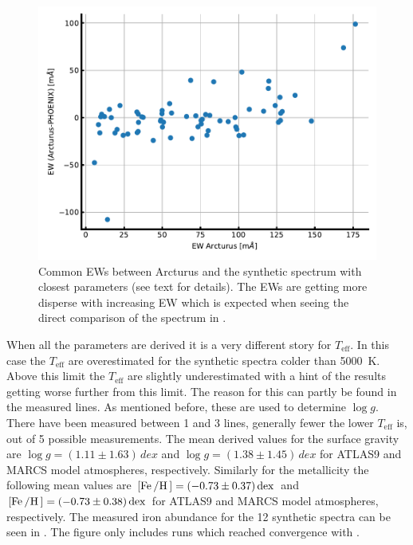\begin{figure}[htpb!]
    \centering
    \includegraphics[width=0.8\linewidth]{figures/commonEWS.pdf}
    \caption{Common EWs between Arcturus and the synthetic spectrum with closest parameters (see
             text for details). The EWs are getting more disperse with increasing EW which is
             expected when seeing the direct comparison of the spectrum in
             .}
    \label{fig:commonEWs}
\end{figure}

When all the parameters are derived it is a very different story for $T_\mathrm{eff}$. In this case
the $T_\mathrm{eff}$ are overestimated for the synthetic spectra colder than \SI{5000}{K}. Above
this limit the $T_\mathrm{eff}$ are slightly underestimated with a hint of the results getting worse
further from this limit. The reason for this can partly be found in the measured  lines.
As mentioned before, these are used to determine $\log g$. There have been measured between 1 and 3
 lines, generally fewer the lower $T_\mathrm{eff}$ is, out of 5 possible measurements.
The mean derived values for the surface gravity are $\log g=(1.11\pm1.63)\,\si{dex}$ and $\log
g=(1.38\pm1.45)\,\si{dex}$ for ATLAS9 and MARCS model atmospheres, respectively. Similarly for the
metallicity the following mean values are $[\ion{Fe}/\ion{H}]=\SI{-0.73(37)}{dex}$ and
$[\ion{Fe}/\ion{H}]=\SI{-0.73(38)}{dex}$ for ATLAS9 and MARCS model atmospheres, respectively.
The measured iron abundance for the 12 synthetic spectra can be seen in .
The figure only includes runs which reached convergence with .

